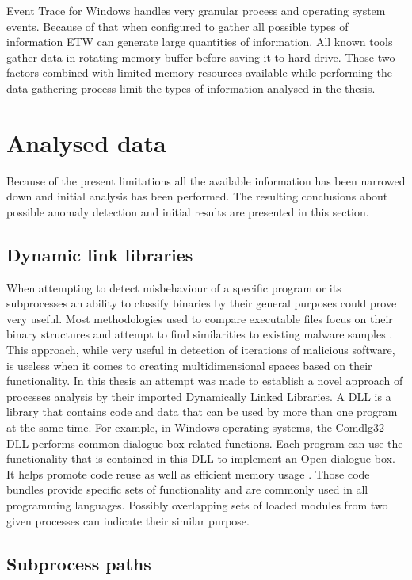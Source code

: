 \documentclass[a4paper,twoside,12pt]{book}
\begin{document}
Event Trace for Windows handles very granular process and operating system events.
Because of that when configured to gather all possible types of information ETW can generate
large quantities of information. All known tools gather data in rotating memory buffer 
before saving it to hard drive. Those two factors combined with limited memory resources 
available while performing the data gathering process limit the types of information analysed 
in the thesis. 

\section{Analysed data}

Because of the present limitations all the available information has been narrowed down and 
initial analysis has been performed. The resulting conclusions about possible anomaly detection 
and initial results are presented in this section.

\subsection{Dynamic link libraries}

When attempting to detect misbehaviour of a specific program or its subprocesses an ability to 
classify binaries by their general purposes could prove very useful. Most methodologies used to 
compare executable files focus on their binary structures and attempt to find similarities to 
existing malware samples \cite{bib:malwclass}. This approach, while very useful in detection of 
iterations of malicious software, is useless when it comes to creating multidimensional spaces 
based on their functionality. In this thesis an attempt was made to establish a novel approach of 
processes analysis by their imported Dynamically Linked Libraries. A DLL is a library that 
contains code and data that can be used by more than one program at the same time. For example, 
in Windows operating systems, the Comdlg32 DLL performs common dialogue box related functions. Each 
program can use the functionality that is contained in this DLL to implement an Open dialogue box. 
It helps promote code reuse as well as efficient memory usage \cite{bib:dll}. Those code bundles provide 
specific sets of functionality and are commonly used in all programming languages. Possibly 
overlapping sets of loaded modules from two given processes can indicate their similar purpose. 

\subsection{Subprocess paths}
\end{document}
